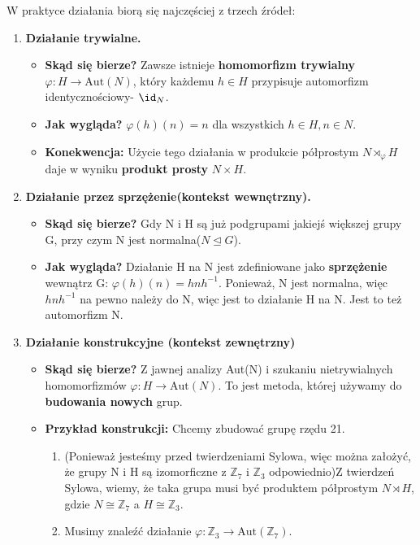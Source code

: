 \begin{remark}
W praktyce działania biorą się najczęściej z trzech źródeł:
\begin{enumerate}[label=\arabic*)]
	\item \textbf{Działanie trywialne.}
		\begin{itemize}
		\item \textbf{Skąd się bierze?} Zawsze istnieje \textbf{homomorfizm trywialny} $\varphi: H \rightarrow \text{Aut}\left( N \right) $, który każdemu $h\in H$ przypisuje automorfizm identycznościowy- $\id_{N}$.
		\item \textbf{Jak wygląda?} $\varphi\left( h \right) \left( n \right) = n$ dla wszystkich $h\in H, n\in N$.
		\item \textbf{Konekwencja:} Użycie tego działania w produkcie półprostym $N\rtimes_{\varphi}H$ daje w wyniku \textbf{produkt prosty } $N\times H$.
		\end{itemize}
	\item \textbf{Działanie przez sprzężenie(kontekst wewnętrzny).} 	       \begin{itemize}
			\item \textbf{Skąd się bierze? } Gdy N i H są już podgrupami jakiejś większej grupy G, przy czym N jest normalna($N\unlhd G$). 
			\item \textbf{Jak wygląda? } Działanie  H na N jest zdefiniowane jako  \textbf{sprzężenie} wewnątrz G: $\varphi\left( h \right) \left( n \right) = hnh^{-1}$. Ponieważ, N jest normalna, więc  $hnh^{-1}$ na pewno należy do N, więc jest to działanie H na N. Jest to też automorfizm N.  
		\end{itemize}
	\item \textbf{Działanie konstrukcyjne (kontekst zewnętrzny)} 
		\begin{itemize}
			\item \textbf{Skąd się bierze? } Z jawnej analizy Aut(N) i szukaniu nietrywialnych homomorfizmów $\varphi: H\rightarrow \text{Aut}\left( N \right) $. To jest metoda, której używamy do \textbf{budowania nowych} grup.
			\item \textbf{Przykład konstrukcji: } Chcemy zbudować grupę rzędu 21.
				\begin{enumerate}[label=\roman*)]
					\item (Ponieważ jesteśmy przed twierdzeniami Sylowa, więc można założyć, że grupy N i H są izomorficzne z $\mathbb{Z}_7$ i $\mathbb{Z}_3$ odpowiednio)Z twierdzeń Sylowa, wiemy, że taka grupa musi być produktem półprostym $N\rtimes H$, gdzie $N \cong \mathbb{Z}_7$ a $H \cong \mathbb{Z}_3$.
					\item Musimy znaleźć działanie $\varphi: \mathbb{Z}_3 \rightarrow \text{Aut}\left( \mathbb{Z}_7 \right)$.

\end{enumerate}
\end{itemize}
\end{enumerate}
\end{remark}
